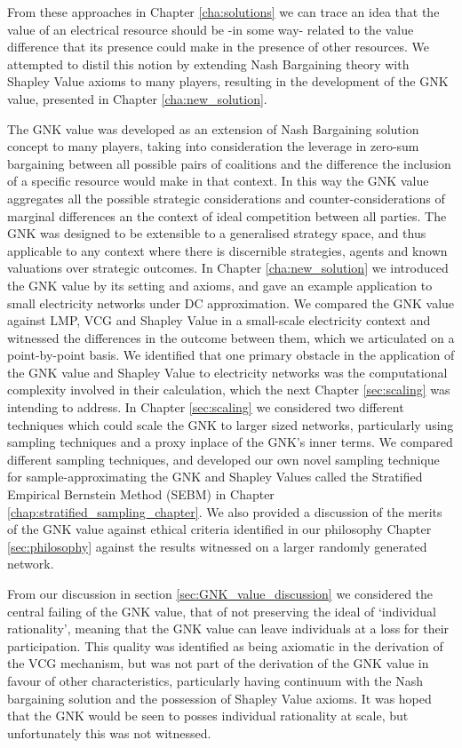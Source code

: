 From these approaches in Chapter \ref{cha:solutions} we can trace an idea that the value of an electrical resource should be -in some way- related to the value difference that its presence could make in the presence of other resources.
We attempted to distil this notion by extending Nash Bargaining theory with Shapley Value axioms to many players, resulting in the development of the GNK value, presented in Chapter \ref{cha:new_solution}.

The GNK value was developed as an extension of Nash Bargaining solution concept to many players, taking into consideration the leverage in zero-sum bargaining between all possible pairs of coalitions and the difference the inclusion of a specific resource would make in that context.
In this way the GNK value aggregates all the possible strategic considerations and counter-considerations of marginal differences an the context of ideal competition between all parties.
The GNK was designed to be extensible to a generalised strategy space, and thus applicable to any context where there is discernible strategies, agents and known valuations over strategic outcomes. 
In Chapter \ref{cha:new_solution} we introduced the GNK value by its setting and axioms, and gave an example application to small electricity networks under DC approximation.
We compared the GNK value against LMP, VCG and Shapley Value in a small-scale electricity context and witnessed the differences in the outcome between them, which we articulated on a point-by-point basis.
We identified that one primary obstacle in the application of the GNK value and Shapley Value to electricity networks was the computational complexity involved in their calculation, which the next Chapter \ref{sec:scaling} was intending to address.
In Chapter \ref{sec:scaling} we considered two different techniques which could scale the GNK to larger sized networks, particularly using sampling techniques and a proxy inplace of the GNK's inner terms.
We compared different sampling techniques, and developed our own novel sampling technique for sample-approximating the GNK and Shapley Values called the Stratified Empirical Bernstein Method (SEBM) in Chapter \ref{chap:stratified_sampling_chapter}.
We also provided a discussion of the merits of the GNK value against ethical criteria identified in our philosophy Chapter \ref{sec:philosophy} against the results witnessed on a larger randomly generated network.

From our discussion in section \ref{sec:GNK_value_discussion} we considered the central failing of the GNK value, that of not preserving the ideal of `individual rationality', meaning that the GNK value can leave individuals at a loss for their participation.
This quality was identified as being axiomatic in the derivation of the VCG mechanism, but was not part of the derivation of the GNK value in favour of other characteristics, particularly having continuum with the Nash bargaining solution and the possession of Shapley Value axioms.
It was hoped that the GNK would be seen to posses individual rationality at scale, but unfortunately this was not witnessed.

